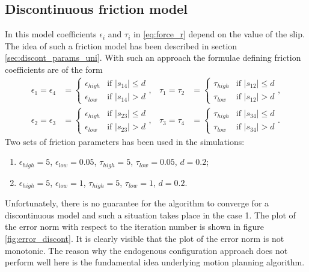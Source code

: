 \subsection{Discontinuous friction model}
In this model coefficients $\epsilon_i$ and $\tau_i$ in \eqref{eq:force_r} depend
on the value of the slip. The idea of such a friction model has been described
in section \ref{sec:discont_params_uni}. With such an approach the formulae defining
friction coefficients are of the form
\begin{equation*}
\begin{aligned}
\epsilon_1=\epsilon_4&=\begin{cases}
\epsilon_{high} &\mbox{if } |s_{14}| \leq d \\
\epsilon_{low} &\mbox{if } |s_{14}| > d
\end{cases}, &
\tau_1=\tau_2&=\begin{cases}
\tau_{high} &\mbox{if } |s_{12}| \leq d \\
\tau_{low} &\mbox{if } |s_{12}| > d
\end{cases},\\
\epsilon_2=\epsilon_3&=\begin{cases}
\epsilon_{high} &\mbox{if } |s_{23}| \leq d \\
\epsilon_{low} &\mbox{if } |s_{23}| > d
\end{cases}, &
\tau_3=\tau_4&=\begin{cases}
\tau_{high} &\mbox{if } |s_{34}| \leq d \\
\tau_{low} &\mbox{if } |s_{34}| > d
\end{cases}.
\end{aligned}
\end{equation*}
Two sets of friction parameters has been used in the simulations:
\begin{enumerate}
\item $\epsilon_{high}=5$, $\epsilon_{low}=0.05$,
$\tau_{high}=5$, $\tau_{low}=0.05$, $d=0.2$;
\item $\epsilon_{high}=5$, $\epsilon_{low}=1$,
$\tau_{high}=5$, $\tau_{low}=1$, $d=0.2$.
\end{enumerate}
Unfortunately, there is no guarantee for the
algorithm to converge for a discontinuous model and such a situation takes place in
the case 1. The plot of the error norm with respect to the iteration number is shown
in figure \ref{fig:error_discont}. It is clearly visible that the plot of the
error norm is not monotonic. The reason why the endogenous configuration approach
does not perform well here is the fundamental idea underlying motion planning algorithm.
